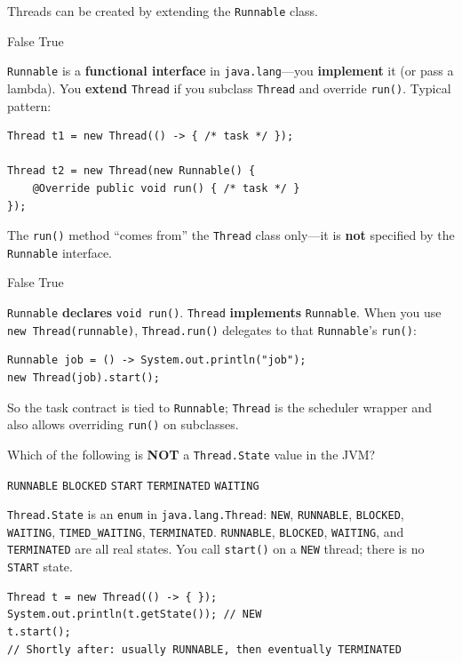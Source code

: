 \question[4]
Threads can be created by extending the \texttt{Runnable} class.
\begin{choices}
  \CorrectChoice False
  \choice True
\end{choices}
\begin{solution}
  \texttt{Runnable} is a \textbf{functional interface} in \texttt{java.lang}---you \textbf{implement} it (or pass a lambda). You \textbf{extend} \texttt{Thread} if you subclass \texttt{Thread} and override \texttt{run()}. Typical pattern:

\begin{lstlisting}[style=java]
Thread t1 = new Thread(() -> { /* task */ });

Thread t2 = new Thread(new Runnable() {
    @Override public void run() { /* task */ }
});
\end{lstlisting}
\end{solution}

\question[4]
The \texttt{run()} method ``comes from'' the \texttt{Thread} class only---it is \textbf{not} specified by the \texttt{Runnable} interface.
\begin{choices}
  \CorrectChoice False
  \choice True
\end{choices}
\begin{solution}
  \texttt{Runnable} \textbf{declares} \texttt{void run()}. \texttt{Thread} \textbf{implements} \texttt{Runnable}. When you use \texttt{new Thread(runnable)}, \texttt{Thread.run()} delegates to that \texttt{Runnable}'s \texttt{run()}:

\begin{lstlisting}[style=java]
Runnable job = () -> System.out.println("job");
new Thread(job).start();
\end{lstlisting}

  So the task contract is tied to \texttt{Runnable}; \texttt{Thread} is the scheduler wrapper and also allows overriding \texttt{run()} on subclasses.
\end{solution}

\question[4]
Which of the following is \textbf{NOT} a \texttt{Thread.State} value in the JVM?
\begin{choices}
  \choice \texttt{RUNNABLE}
  \choice \texttt{BLOCKED}
  \CorrectChoice \texttt{START}
  \choice \texttt{TERMINATED}
  \choice \texttt{WAITING}
\end{choices}
\begin{solution}
  \texttt{Thread.State} is an \texttt{enum} in \texttt{java.lang.Thread}: \texttt{NEW}, \texttt{RUNNABLE}, \texttt{BLOCKED}, \texttt{WAITING}, \texttt{TIMED\_WAITING}, \texttt{TERMINATED}. \texttt{RUNNABLE}, \texttt{BLOCKED}, \texttt{WAITING}, and \texttt{TERMINATED} are all real states. You call \texttt{start()} on a \texttt{NEW} thread; there is no \texttt{START} state.

\begin{lstlisting}[style=java]
Thread t = new Thread(() -> { });
System.out.println(t.getState()); // NEW
t.start();
// Shortly after: usually RUNNABLE, then eventually TERMINATED
\end{lstlisting}
\end{solution}

